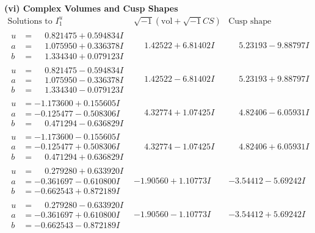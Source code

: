 \documentclass[1p]{elsarticle_modified}
\theoremstyle{definition}
\newcommand{\I}{\sqrt{-1}}
\begin{document}
\newpage\flushleft \textbf{(vi) Complex Volumes and Cusp Shapes}
$$\begin{array}{c|c|c}  
\text{Solutions to }I^u_{1}& \I (\text{vol} + \sqrt{-1}CS) & \text{Cusp shape}\\
 \hline 
\begin{aligned}
u &= \phantom{-}0.821475 + 0.594834 I \\
a &= \phantom{-}1.075950 + 0.336378 I \\
b &= \phantom{-}1.334340 + 0.079123 I\end{aligned}
 & \phantom{-}1.42522 + 6.81402 I & \phantom{-}5.23193 - 9.88797 I \\ \hline\begin{aligned}
u &= \phantom{-}0.821475 - 0.594834 I \\
a &= \phantom{-}1.075950 - 0.336378 I \\
b &= \phantom{-}1.334340 - 0.079123 I\end{aligned}
 & \phantom{-}1.42522 - 6.81402 I & \phantom{-}5.23193 + 9.88797 I \\ \hline\begin{aligned}
u &= -1.173600 + 0.155605 I \\
a &= -0.125477 - 0.508306 I \\
b &= \phantom{-}0.471294 - 0.636829 I\end{aligned}
 & \phantom{-}4.32774 + 1.07425 I & \phantom{-}4.82406 - 6.05931 I \\ \hline\begin{aligned}
u &= -1.173600 - 0.155605 I \\
a &= -0.125477 + 0.508306 I \\
b &= \phantom{-}0.471294 + 0.636829 I\end{aligned}
 & \phantom{-}4.32774 - 1.07425 I & \phantom{-}4.82406 + 6.05931 I \\ \hline\begin{aligned}
u &= \phantom{-}0.279280 + 0.633920 I \\
a &= -0.361697 - 0.610800 I \\
b &= -0.662543 + 0.872189 I\end{aligned}
 & -1.90560 + 1.10773 I & -3.54412 - 5.69242 I \\ \hline\begin{aligned}
u &= \phantom{-}0.279280 - 0.633920 I \\
a &= -0.361697 + 0.610800 I \\
b &= -0.662543 - 0.872189 I\end{aligned}
 & -1.90560 - 1.10773 I & -3.54412 + 5.69242 I \\ \hline\begin{aligned}

\end{aligned}
\end{array}$$
\end{document}
